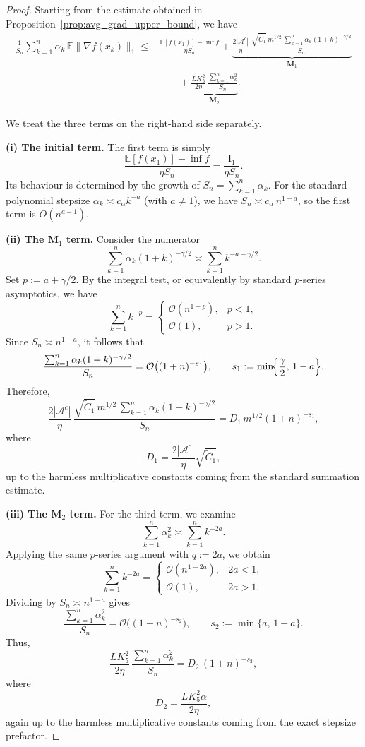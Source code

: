 \documentclass{article}
\begin{document}
\begin{proof}
Starting from the estimate obtained in
Proposition~\ref{prop:avg_grad_upper_bound}, we have
\begin{equation}
\begin{aligned}
\frac{1}{S_n}\sum_{k=1}^n \alpha_k\,\mathbb{E}\|\nabla f(x_k)\|_1
\le{}&
\frac{\mathbb{E}[f(x_1)]-\inf f}{\eta S_n}
+ \underbrace{\frac{2|\mathcal{A}^c|}{\eta}\,
\frac{\sqrt{\widetilde C_1}\,m^{1/2}\,\sum_{k=1}^n \alpha_k(1+k)^{-\gamma/2}}{S_n}}_{\mathbf{M}_1}
\\
&\qquad
+ \underbrace{\frac{L K_5^2}{2\eta}\,
\frac{\sum_{k=1}^n \alpha_k^2}{S_n}}_{\mathbf{M}_2}.
\end{aligned}
\label{eq:avg_grad_bound_recall}
\end{equation}

We treat the three terms on the right-hand side separately.

\medskip\noindent\textbf{(i) The initial term.}
The first term is simply
\[
\frac{\mathbb{E}[f(x_1)]-\inf f}{\eta S_n}
= \frac{\mathrm{I}_1}{\eta S_n}.
\]
Its behaviour is determined by the growth of \(S_n=\sum_{k=1}^n \alpha_k\).
For the standard polynomial stepsize \(\alpha_k \asymp c_\alpha k^{-a}\)
(with \(a\neq 1\)), we have \(S_n \asymp c_\alpha\,n^{1-a}\), so the first
term is \(O(n^{a-1})\). 

\medskip\noindent\textbf{(ii) The \(\mathbf{M}_1\) term.}
Consider the numerator
\[
\sum_{k=1}^n \alpha_k(1+k)^{-\gamma/2}
\asymp \sum_{k=1}^n k^{-a-\gamma/2}.
\]
Set \(p := a+\gamma/2\). By the integral test, or equivalently by standard
\(p\)-series asymptotics, we have
\[
\sum_{k=1}^n k^{-p}
=
\begin{cases}
\mathcal{O}\!\left(n^{1-p}\right), & p<1,\\[4pt]
\mathcal{O}(1), & p>1.
\end{cases}
\]
Since \(S_n \asymp n^{1-a}\), it follows that
\[
\frac{\sum_{k=1}^n \alpha_k(1+k)^{-\gamma/2}}{S_n}
=
\mathcal{O}\bigl((1+n)^{-s_1}\bigr),
\qquad
s_1:=\min\!\Bigl\{\frac{\gamma}{2},\,1-a\Bigr\}.
\]
Therefore,
\[
\frac{2|\mathcal{A}^c|}{\eta}\,
\frac{\sqrt{\widetilde C_1}\,m^{1/2}\,\sum_{k=1}^n \alpha_k(1+k)^{-\gamma/2}}{S_n}
=
D_1\,m^{1/2}(1+n)^{-s_1},
\]
where
\[
D_1=\frac{2|\mathcal{A}^c|}{\eta}\sqrt{\widetilde C_1},
\]
up to the harmless multiplicative constants coming from the standard
summation estimate.

\medskip\noindent\textbf{(iii) The \(\mathbf{M}_2\) term.}
For the third term, we examine
\[
\sum_{k=1}^n \alpha_k^2 \asymp \sum_{k=1}^n k^{-2a}.
\]
Applying the same \(p\)-series argument with \(q:=2a\), we obtain
\[
\sum_{k=1}^n k^{-2a}
=
\begin{cases}
\mathcal{O}\!\left(n^{1-2a}\right), & 2a<1,\\[4pt]
\mathcal{O}(1), & 2a>1.
\end{cases}
\]
Dividing by \(S_n \asymp n^{1-a}\) gives
\[
\frac{\sum_{k=1}^n \alpha_k^2}{S_n}
=
\mathcal{O}\bigl((1+n)^{-s_2}\bigr),
\qquad
s_2:=\min\{a,\,1-a\}.
\]
Thus,
\[
\frac{L K_5^2}{2\eta}\,
\frac{\sum_{k=1}^n \alpha_k^2}{S_n}
=
D_2\,(1+n)^{-s_2},
\]
where
\[
D_2=\frac{L K_5^2 \alpha}{2\eta},
\]
again up to the harmless multiplicative constants coming from the exact
stepsize prefactor.


\end{proof}
\end{document}
